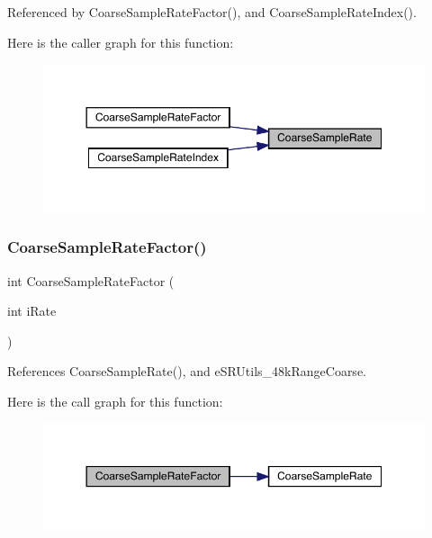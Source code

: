 Referenced by Coarse\+Sample\+Rate\+Factor(), and Coarse\+Sample\+Rate\+Index().

Here is the caller graph for this function\+:
\nopagebreak
\begin{figure}[H]
\begin{center}
\leavevmode
\includegraphics[width=350pt]{a00782_ab463c18c13ba2c75b89da6c90f02d0f0_icgraph}
\end{center}
\end{figure}
\mbox{\label{a00782_a781f007f979a98d27156a4675fd853fa}} 
\subsubsection{\texorpdfstring{CoarseSampleRateFactor()}{CoarseSampleRateFactor()}}
{\footnotesize\ttfamily int Coarse\+Sample\+Rate\+Factor (\begin{DoxyParamCaption}\item[{int}]{i\+Rate }\end{DoxyParamCaption})\hspace{0.3cm}{\ttfamily [inline]}}



References Coarse\+Sample\+Rate(), and e\+S\+R\+Utils\+\_\+48k\+Range\+Coarse.

Here is the call graph for this function\+:
\nopagebreak
\begin{figure}[H]
\begin{center}
\leavevmode
\includegraphics[width=350pt]{a00782_a781f007f979a98d27156a4675fd853fa_cgraph}
\end{center}
\end{figure}
\mbox{\label{a00782_a149fe437454807a2d3edacf8de72c2a1}} 
